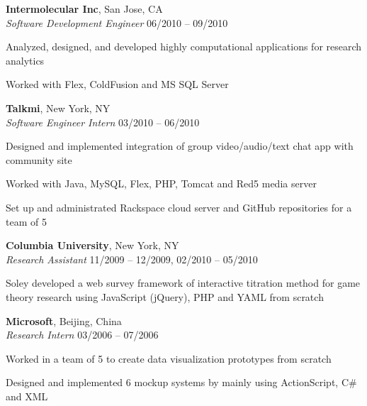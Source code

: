 \documentclass[margin,line]{resume}
\begin{document}
\begin{resume}
    \textbf{Intermolecular Inc}, San Jose, CA \\
    \textsl{Software Development Engineer} \hfill 06/2010 -- 09/2010 \vspace{-3mm}\\\vspace{-1mm}%
      \begin{list2}
      \item Analyzed, designed, and developed highly computational applications for research analytics
      \item Worked with Flex, ColdFusion and MS SQL Server
      \end{list2}

    \textbf{Talkmi}, New York, NY \\
    \textsl{Software Engineer Intern} \hfill 03/2010 -- 06/2010 \vspace{-3mm}\\\vspace{-1mm}%
      \begin{list2}
      \item Designed and implemented integration of group video/audio/text chat app with community site
      \item Worked with Java, MySQL, Flex, PHP, Tomcat and Red5 media server	    
      \item Set up and administrated Rackspace cloud server and GitHub repositories for a team of 5
      \end{list2}

    \textbf{Columbia University}, New York, NY \\
    \textsl{Research Assistant} \hfill 11/2009 -- 12/2009, 02/2010 -- 05/2010 \vspace{-3mm}\\\vspace{-1mm}%
      \begin{list2} 
      \item Soley developed a web survey framework of interactive titration method for game theory research using JavaScript (jQuery), PHP and YAML from scratch
      \end{list2}

    \textbf{Microsoft}, Beijing, China \\
    \textsl{Research Intern} \hfill 03/2006 -- 07/2006 \vspace{-3mm}\\\vspace{-1mm}%
      \begin{list2}
      \item Worked in a team of 5 to create data visualization prototypes from scratch
      \item Designed and implemented 6 mockup systems by mainly using ActionScript, C\# and XML
      \end{list2}


\end{resume}
\end{document}
